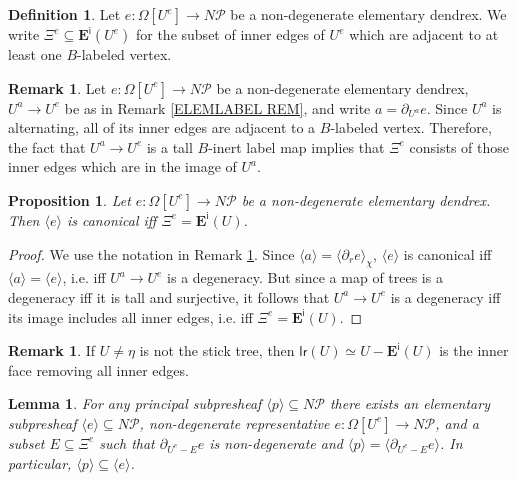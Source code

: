\documentclass[a4paper,10pt
,draft
]{article}%
\numberwithin{equation}{section}
\numberwithin{figure}{section}
\newtheorem{lemma}[equation]{Lemma}%
\newtheorem{proposition}[equation]{Proposition}%
\theoremstyle{definition} %
\newtheorem{definition}[equation]{Definition}%
\newtheorem{remark}[equation]{Remark}%
\newcommand{\1}{\ensuremath{\mathbbm 1}}%
\begin{document}
\begin{definition}\label{XIEDGES DEF}
	Let $e \colon \Omega[U^e] \to N \mathcal{P}$ be a non-degenerate elementary dendrex. 
	We write
	$\Xi^e \subseteq \boldsymbol{E}^{\mathsf{i}}(U^e)$
	for the subset of inner edges of $U^e$ which are adjacent to at least one $B$-labeled vertex.
\end{definition}




\begin{remark}\label{XIEREDEF REM}
	Let $e \colon \Omega[U^e] \to N \mathcal{P}$ be a non-degenerate elementary dendrex, 
	$U^a \to U^e$ be as in Remark \ref{ELEMLABEL REM}, 
	and write $a = \partial_{U^a} e$.
	Since $U^a$ is alternating, all of its inner edges are adjacent to a 
	$B$-labeled vertex. 
	Therefore, the fact that $U^a \to U^e$ is a tall $B$-inert label map
	implies that $\Xi^e$ consists of those inner edges which are in the image of $U^a$.
\end{remark}



\begin{proposition}\label{CANIFFXIE PROP}
	Let $e \colon \Omega[U^e] \to N \mathcal{P}$ be a non-degenerate elementary dendrex.
	Then $\langle e \rangle$
	is canonical iff $\Xi^e = \boldsymbol{E}^{\mathsf{i}}(U)$.
\end{proposition}

\begin{proof}
	We use the notation in Remark \ref{XIEREDEF REM}.
	Since $\langle a\rangle = \langle \partial_r e \rangle_{\chi}$, 
	$\langle e \rangle$
	is canonical 
	iff
	$\langle a\rangle = \langle e \rangle$, i.e.
	iff
	$U^a \to U^e$ is a degeneracy. 
	But since a map of trees is a degeneracy iff it is tall and surjective,
	it follows that $U^a \to U^e$ is a degeneracy
	iff its image includes all inner edges, i.e. iff $\Xi^e = \boldsymbol{E}^{\mathsf{i}}(U)$.
\end{proof}



\begin{remark}\label{WHENLRINN REM}
	If $U\neq \eta$ is not the stick tree,
	then $\mathsf{lr}(U) \simeq U - \boldsymbol{E}^{\mathsf{i}}(U)$
	is the inner face removing all inner edges.
\end{remark}



\begin{lemma}\label{ELEMEXIST LEM}
	For any principal subpresheaf $\langle p \rangle \subseteq N \mathcal{P}$
	there exists an elementary subpresheaf
	$\langle e \rangle \subseteq N \mathcal P$, 
	non-degenerate representative 
	$e \colon \Omega[U^e] \to N \mathcal{P}$,
	and a subset $E \subseteq \Xi^{e}$
	such that
	$\partial_{U^e-E} e$ is non-degenerate and 
	$\langle p \rangle = \langle \partial_{U^e-E} e \rangle$.
	In particular,  
	$\langle p \rangle \subseteq \langle e \rangle$.
\end{lemma}
\end{document}
